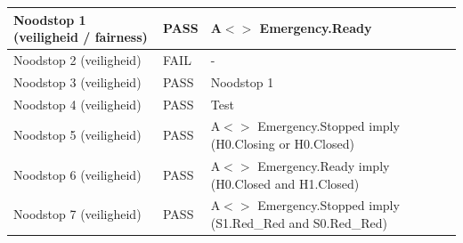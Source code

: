 \documentclass{article}
\begin{document}
\begin{tabular}{ |p{4cm}||p{2cm}|p{7cm}|}
            Noodstop 1 (veiligheid / fairness)              &           \leavevmode\color[HTML]{32CD32} PASS          &         A$<>$ Emergency.Ready        \\ \hline
            Noodstop 2 (veiligheid)                         &           \leavevmode\color[HTML]{FF0000} FAIL          &         -        \\ \hline
            Noodstop 3 (veiligheid)                         &           \leavevmode\color[HTML]{32CD32} PASS          &         Noodstop 1        \\ \hline
            Noodstop 4 (veiligheid)                         &           \leavevmode\color[HTML]{FF0000} PASS          &         Test        \\ \hline
            Noodstop 5 (veiligheid)                         &           \leavevmode\color[HTML]{32CD32} PASS          &         A$<>$ Emergency.Stopped imply (H0.Closing or H0.Closed)        \\ \hline
            Noodstop 6 (veiligheid)                         &           \leavevmode\color[HTML]{32CD32} PASS          &         A$<>$ Emergency.Ready imply (H0.Closed and H1.Closed)        \\ \hline
            Noodstop 7 (veiligheid)                         &           \leavevmode\color[HTML]{32CD32} PASS          &         A$<>$ Emergency.Stopped imply (S1.Red\_Red and S0.Red\_Red)\\
        \hline
    \end{tabular}





\newpage


\end{document}
